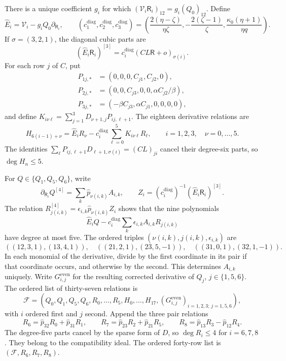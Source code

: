 \documentclass[11pt,a4paper]{article}
\numberwithin{equation}{section}
\theoremstyle{plain}
\theoremstyle{definition}
\theoremstyle{remark}
\begin{document}
There is a unique coefficient $g_i$ for which
$(\mathcal V_i\mathsf R_i)_{12}=g_i(Q_0)_{12}$. Define
\[
 \widehat E_i=\mathcal V_i-g_iQ_0\partial_{\mathsf R_i},\qquad
 (c_1^{\mathrm{diag}},c_2^{\mathrm{diag}},c_3^{\mathrm{diag}})
 =\left(\frac{2(\eta-\zeta)}{\eta\zeta},
          -\frac{2(\zeta-1)}\zeta,
          \frac{\kappa_0(\eta+1)}{\eta q}\right).
\]
If $\sigma=(3,2,1)$, the diagonal cubic parts are
\[
 (\widehat E_i\mathsf R_i)^{[3]}
       =c_i^{\mathrm{diag}}(CL\mathsf R+o)_{\sigma(i)}.
\]
For each row $j$ of $C$, put
\[
\begin{aligned}
 P_{1j,*}&=(0,0,0,C_{j1},C_{j2},0),\\
 P_{2j,*}&=(0,0,C_{j3},0,0,\alpha C_{j2}/\beta),\\
 P_{3j,*}&=(-\beta C_{j3},\alpha C_{j1},0,0,0,0),
\end{aligned}
\]
and define $K_{i\nu\ell}=\sum_{j=1}^3D_{\nu+1,j}P_{ij,\ell+1}$.
The eighteen derivative relations are
\[
 H_{6(i-1)+\nu}
  =\widehat E_i R_\nu-c_i^{\mathrm{diag}}
       \sum_{\ell=0}^5K_{i\nu\ell}R_\ell,
 \qquad i=1,2,3,\quad \nu=0,\ldots,5.
\]
The identities
$\sum_\ell P_{ij,\ell+1}D_{\ell+1,\sigma(i)}=(CL)_{ji}$
cancel their degree-six parts, so $\deg H_n\le5$.

For $Q\in\{Q_1,Q_5,Q_6\}$, write
\[
 \partial_{\mathsf R_i}Q^{[4]}
          =\sum_k\widehat p_{\nu(i,k)}A_{i,k},\qquad
 Z_i=(c_i^{\mathrm{diag}})^{-1}(\widehat E_i\mathsf R_i)^{[3]}.
\]
The relation
$R_{j(i,k)}^{[4]}=\epsilon_{i,k}\widehat p_{\nu(i,k)}Z_i$
shows that the nine polynomials
\[
 \widehat E_iQ-c_i^{\mathrm{diag}}
          \sum_k\epsilon_{i,k}A_{i,k}R_{j(i,k)}
\]
have degree at most five. The ordered triples $(\nu(i,k),j(i,k),\epsilon_{i,k})$ are
\[
 ((12,3,1),(13,4,1)),\quad
 ((21,2,1),(23,5,-1)),\quad
 ((31,0,1),(32,1,-1)).
\]
In each monomial of the derivative, divide by the first coordinate
in its pair if that coordinate occurs, and otherwise by the second.
This determines $A_{i,k}$ uniquely. Write $G_{i,j}^{\mathrm{even}}$
for the resulting corrected derivative of $Q_j$, $j\in\{1,5,6\}$.
The ordered list of thirty-seven relations is
\[
 \mathscr F=(Q_0,Q_1,Q_5,Q_6,R_0,\ldots,R_5,
             H_0,\ldots,H_{17},
             (G_{i,j}^{\mathrm{even}})_{i=1,2,3;\,j=1,5,6}),
\]
with $i$ ordered first and $j$ second.
Append the three pair relations
\[
 R_6=\widehat p_{32}R_0+\widehat p_{31}R_1,\qquad
 R_7=\widehat p_{23}R_2+\widehat p_{21}R_5,\qquad
 R_8=\widehat p_{13}R_3-\widehat p_{12}R_4.
\]
The degree-five parts cancel by the sparse form of $D$, so
$\deg R_i\le4$ for $i=6,7,8$. They belong to the compatibility ideal.
The ordered forty-row list is $(\mathscr F,R_6,R_7,R_8)$.
\end{document}
